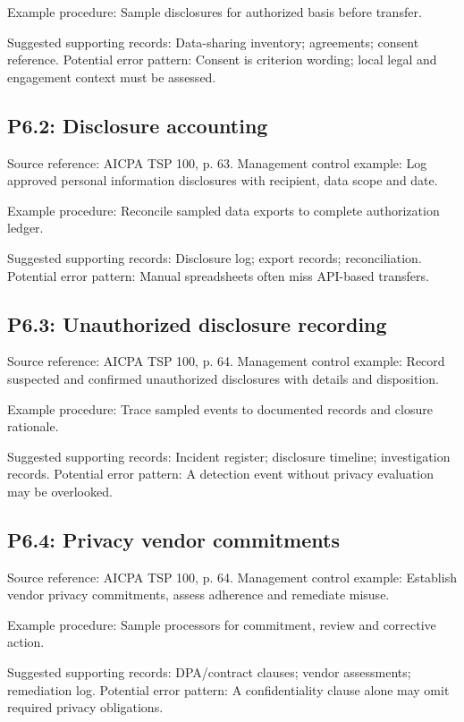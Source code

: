 \documentclass[10pt,oneside]{report}
\begin{document}
Example procedure: Sample disclosures for authorized basis before transfer.

Suggested supporting records: Data-sharing inventory; agreements; consent reference. Potential error pattern: Consent is criterion wording; local legal and engagement context must be assessed.

\subsection*{P6.2: Disclosure accounting}
Source reference: AICPA TSP 100, p. 63. Management control example: Log approved personal information disclosures with recipient, data scope and date.

Example procedure: Reconcile sampled data exports to complete authorization ledger.

Suggested supporting records: Disclosure log; export records; reconciliation. Potential error pattern: Manual spreadsheets often miss API-based transfers.

\subsection*{P6.3: Unauthorized disclosure recording}
Source reference: AICPA TSP 100, p. 64. Management control example: Record suspected and confirmed unauthorized disclosures with details and disposition.

Example procedure: Trace sampled events to documented records and closure rationale.

Suggested supporting records: Incident register; disclosure timeline; investigation records. Potential error pattern: A detection event without privacy evaluation may be overlooked.

\subsection*{P6.4: Privacy vendor commitments}
Source reference: AICPA TSP 100, p. 64. Management control example: Establish vendor privacy commitments, assess adherence and remediate misuse.

Example procedure: Sample processors for commitment, review and corrective action.

Suggested supporting records: DPA/contract clauses; vendor assessments; remediation log. Potential error pattern: A confidentiality clause alone may omit required privacy obligations.
\end{document}
